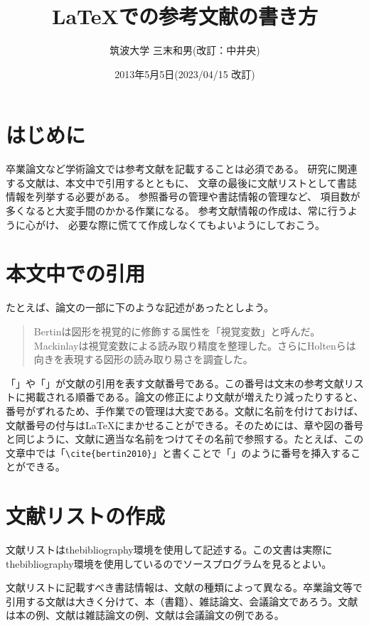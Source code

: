 \documentclass[fontsize=12pt,paper=a4]{jlreq}
\title{\LaTeX での参考文献の書き方}
\author{筑波大学 三末和男(改訂：中井央)}
\date{2013年5月5日(2023/04/15 改訂)}
\begin{document}
\maketitle

\section{はじめに}

卒業論文など学術論文では参考文献を記載することは必須である。
研究に関連する文献は、本文中で引用するとともに、
文章の最後に文献リストとして書誌情報を列挙する必要がある。
参照番号の管理や書誌情報の管理など、
項目数が多くなると大変手間のかかる作業になる。
参考文献情報の作成は、常に行うように心がけ、
必要な際に慌てて作成しなくてもよいようにしておこう。

\section{本文中での引用}

たとえば、論文の一部に下のような記述があったとしよう。

\begin{quote}
Bertinは図形を視覚的に修飾する属性を「視覚変数」と呼んだ\cite{bertin2010}。Mackinlayは視覚変数による読み取り精度を整理した\cite{mackinlay1986}。さらにHoltenらは向きを表現する図形の読み取り易さを調査した\cite{holten2009}。
\end{quote}

「\cite{bertin2010}」や「\cite{mackinlay1986}」が文献の引用を表す文献番号である。この番号は文末の参考文献リストに掲載される順番である。論文の修正により文献が増えたり減ったりすると、番号がずれるため、手作業での管理は大変である。文献に名前を付けておけば、文献番号の付与は\LaTeX にまかせることができる。そのためには、章や図の番号と同じように、文献に適当な名前をつけてその名前で参照する。たとえば、この文章中では「\verb|\cite{bertin2010}|」と書くことで「\cite{bertin2010}」のように番号を挿入することができる。

\section{文献リストの作成}

文献リストはthebibliography環境を使用して記述する。この文書は実際にthebibliography環境を使用しているのでソースプログラムを見るとよい。

文献リストに記載すべき書誌情報は、文献の種類によって異なる。卒業論文等で引用する文献は大きく分けて、本（書籍）、雑誌論文、会議論文であろう。文献\cite{bertin2010}は本の例、文献\cite{mackinlay1986}は雑誌論文の例、文献\cite{holten2009}は会議論文の例である。
\end{document}
